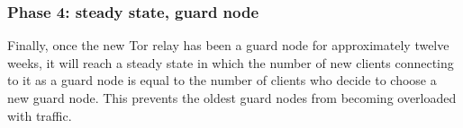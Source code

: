 \documentclass[12pt,journal]{IEEEtran}
\begin{document}
\subsubsection{Phase 4: steady state, guard node}
Finally, once the new Tor relay has been a guard node for approximately twelve weeks, it will reach a steady state in which the number of new clients connecting to it as a guard node is equal to the number of clients who decide to choose a new guard node. This prevents the oldest guard nodes from becoming overloaded with traffic.

\printbibliography
\end{document}
